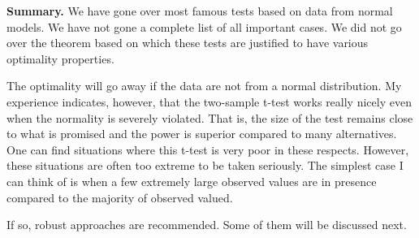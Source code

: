 \vs
\noindent
{\bf Summary.} We have gone over most famous tests based on
data from normal models. We have not gone a complete list
of all important cases.
We did not go over the theorem based on which these tests
are justified to have various optimality properties.

The optimality will go away if the data are not from  a normal distribution.
My experience indicates, however,
that the two-sample t-test works really nicely even 
when the normality is severely violated. 
That is, the size of the test remains close to what is promised
and the power is superior compared to many alternatives.
One can find situations where this t-test is very poor in these
respects. However, these situations are often too extreme to be taken
seriously. The simplest case I can think of is when a few extremely
large observed values are in presence compared to the
majority of observed valued.

If so, robust approaches are recommended.
Some of them will be discussed next.

